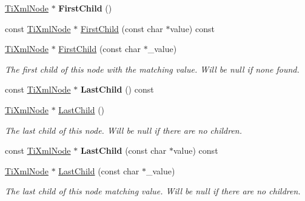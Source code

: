 \begin{DoxyCompactItemize}
\mbox{\label{classTiXmlNode_a5e97d69b7c0ebd27fb7286be56559b77}} 
\hyperlink{classTiXmlNode}{Ti\+Xml\+Node} $\ast$ {\bfseries First\+Child} ()
\item 
const \hyperlink{classTiXmlNode}{Ti\+Xml\+Node} $\ast$ \hyperlink{classTiXmlNode_ae98c367f664890c4b5a5183481ec128a}{First\+Child} (const char $\ast$value) const
\item 
\mbox{\label{classTiXmlNode_abc8bf32be6419ec453a731868de19554}} 
\hyperlink{classTiXmlNode}{Ti\+Xml\+Node} $\ast$ \hyperlink{classTiXmlNode_abc8bf32be6419ec453a731868de19554}{First\+Child} (const char $\ast$\+\_\+value)
\begin{DoxyCompactList}\small\item\em The first child of this node with the matching \textquotesingle{}value\textquotesingle{}. Will be null if none found. \end{DoxyCompactList}\item 
\mbox{\label{classTiXmlNode_af3a04120b1ed2fead2f4bb72cbea845e}} 
const \hyperlink{classTiXmlNode}{Ti\+Xml\+Node} $\ast$ {\bfseries Last\+Child} () const
\item 
\mbox{\label{classTiXmlNode_a6432d2b2495f6caf9cb4278df706a031}} 
\hyperlink{classTiXmlNode}{Ti\+Xml\+Node} $\ast$ \hyperlink{classTiXmlNode_a6432d2b2495f6caf9cb4278df706a031}{Last\+Child} ()
\begin{DoxyCompactList}\small\item\em The last child of this node. Will be null if there are no children. \end{DoxyCompactList}\item 
\mbox{\label{classTiXmlNode_afdd7b6ba456fdd570610c1d841f91eb3}} 
const \hyperlink{classTiXmlNode}{Ti\+Xml\+Node} $\ast$ {\bfseries Last\+Child} (const char $\ast$value) const
\item 
\mbox{\label{classTiXmlNode_abad5bf1059c48127b958711ef89e8e5d}} 
\hyperlink{classTiXmlNode}{Ti\+Xml\+Node} $\ast$ \hyperlink{classTiXmlNode_abad5bf1059c48127b958711ef89e8e5d}{Last\+Child} (const char $\ast$\+\_\+value)
\begin{DoxyCompactList}\small\item\em The last child of this node matching \textquotesingle{}value\textquotesingle{}. Will be null if there are no children. \end{DoxyCompactList}\item 

\end{DoxyCompactItemize}
